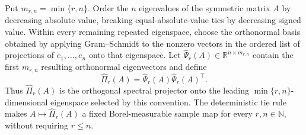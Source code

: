 Put \(m_{r,n}=\min\{r,n\}\).  Order the \(n\) eigenvalues of the symmetric matrix \(A\) by decreasing absolute value, breaking equal-absolute-value ties by decreasing signed value.  Within every remaining repeated eigenspace, choose the orthonormal basis obtained by applying Gram--Schmidt to the nonzero vectors in the ordered list of projections of \(e_1,\ldots,e_n\) onto that eigenspace.  Let \(\widehat\Psi_r(A)\in\mathbb R^{n\times m_{r,n}}\) contain the first \(m_{r,n}\) resulting orthonormal eigenvectors and define
\[
 \widehat\Pi_r(A)=\widehat\Psi_r(A)\widehat\Psi_r(A)^\top.
\]
Thus \(\widehat\Pi_r(A)\) is the orthogonal spectral projector onto the leading \(\min\{r,n\}\)-dimensional eigenspace selected by this convention.  The deterministic tie rule makes \(A\mapsto\widehat\Pi_r(A)\) a fixed Borel-measurable sample map for every \(r,n\in\mathbb N\), without requiring \(r\leq n\).